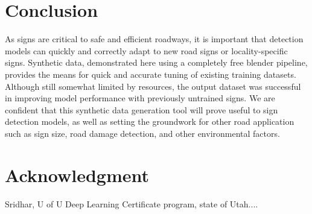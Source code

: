\documentclass[journal]{IEEEtran}
\begin{document}
\section{Conclusion}
As signs are critical to safe and efficient roadways, it is important that detection models can quickly and correctly adapt to new road signs or locality-specific signs. Synthetic data, demonstrated here using a completely free blender pipeline, provides the means for quick and accurate tuning of existing training datasets. Although still somewhat limited by resources, the output dataset was successful in improving model performance with previously untrained signs. We are confident that this synthetic data generation tool will prove useful to sign detection models, as well as setting the groundwork for other road application such as sign size, road damage detection, and other environmental factors. 



\section*{Acknowledgment}


Sridhar, U of U Deep Learning Certificate program, state of Utah.... 


\ifCLASSOPTIONcaptionsoff
  \newpage
\fi





%
%
%
\end{document}

